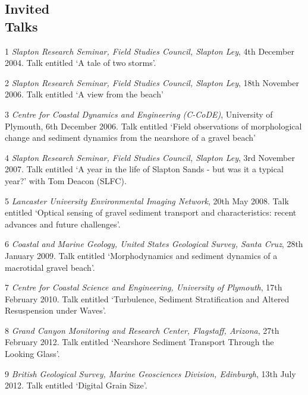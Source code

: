 \documentclass[margin,line]{resume}
\begin{document}
\begin{resume}
 	\section{\mysidestyle Invited \\Talks}
       \begin{footnotesize}
 	\begin{list1}
 	\item[1] {\sl Slapton Research Seminar, Field Studies Council, Slapton Ley}, 4th December 2004. Talk entitled `A tale of two storms'.\\
 	\item[2] {\sl Slapton Research Seminar, Field Studies Council, Slapton Ley}, 18th November 2006. Talk entitled `A view from the beach'\\
 	\item[3] {\sl Centre for Coastal Dynamics and Engineering (C-CoDE)}, University of Plymouth, 6th December 2006.  Talk entitled `Field observations of morphological change and sediment dynamics from the nearshore of a gravel beach'\\
 	\item[4] {\sl Slapton Research Seminar, Field Studies Council, Slapton Ley}, 3rd November 2007. Talk entitled `A year in the life of Slapton Sands - but was it a typical year?' with Tom Deacon (SLFC).\\
 	\item[5] {\sl Lancaster University Environmental Imaging Network}, 20th May 2008. Talk entitled `Optical sensing of gravel sediment transport and characteristics: recent advances and future challenges'.\\
         \item[6] {\sl Coastal and Marine Geology, United States Geological Survey, Santa Cruz}, 28th January 2009. Talk entitled `Morphodynamics and sediment dynamics of a macrotidal gravel beach'.\\
         \item[7] {\sl Centre for Coastal Science and Engineering, University of Plymouth}, 17th February 2010. Talk entitled `Turbulence, Sediment Stratification and Altered Resuspension under Waves'.\\
         \item[8] {\sl Grand Canyon Monitoring and Research Center, Flagstaff, Arizona}, 27th February 2012. Talk entitled `Nearshore Sediment Transport Through the Looking Glass'.\\
         \item[9] {\sl British Geological Survey, Marine Geosciences Division, Edinburgh}, 13th July 2012. Talk entitled `Digital Grain Size'. \\

\end{list1}
\end{footnotesize}
\end{resume}
\end{document}
